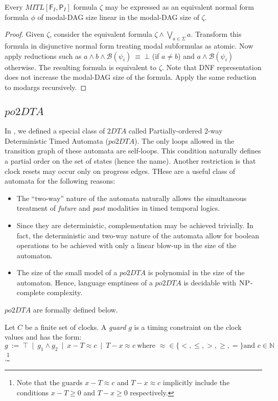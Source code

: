 \documentclass{llncs}
\newcommand{\class}{\textsc}
\newcommand{\fut}{\textsf{F}}
\newcommand{\past}{\textsf{P}}
\newcommand{\mitlfp}{\mbox{$\mathit{MITL[\fut_I,\past_I]}$}}
\newcommand{\potdta}{\mbox{$\mathit{po2DTA}$}}
\newcommand{\twodta}{\mbox{$\mathit{2DTA}$}}
\newcommand{\np}{\mbox{$\class{NP}$}}
\newcommand{\tab}{\hspace*{1cm}}
\begin{document}
\begin{proposition}\label{prop:norm}
Every \mitlfp\/ formula $\zeta$ may be expressed as an equivalent normal form formula $\phi$ of modal-DAG size linear in the  modal-DAG size of $\zeta$.
\end{proposition}
\begin{proof}
Given $\zeta$, consider the equivalent formula $\zeta \land \bigvee\limits_{a \in \Sigma} a$. Transform this formula in disjunctive normal form treating modal subformulas as atomic. Now apply reductions such as 
$a\land b\land \mathscr B(\psi_i) ~\equiv~ \bot$ (if $a\neq b$) and $a\land \mathscr B(\psi_i)$ otherwise. The resulting formula is equivalent to $\zeta$.
Note that  DNF representation does not increase the modal-DAG size of the formula. Apply the same reduction to modargs recursively.  
\end{proof}



\subsection{\potdta}
In \cite{PS10}, we defined a special class of \twodta\/ called Partially-ordered 2-way Deterministic Timed Automata (\potdta). The only loops allowed in the transition graph of these automata are self-loops. This condition naturally defines a partial order on the set of states (hence the name). Another restriction is that clock resets may occur only on progress edges. THese are a useful class of automata for the following reasons: 
\begin{itemize}
\item The ``two-way'' nature of the automata naturally allows the simultaneous treatment of \textit{future} and \textit{past} modalities in timed temporal logics.
\item Since they are deterministic, complementation may be achieved trivially. In fact, the deterministic and two-way nature of the automata allow for boolean operations to be achieved with only a linear blow-up in the size of the automaton.
\item The size of the small model of a \potdta\/ is polynomial in the size of the automaton. Hence, language emptiness of a \potdta\/ is decidable with \np-complete complexity.
\end{itemize} 

\potdta\/ are formally defined below.

Let $C$ be a finite set of clocks. A \emph{guard} $g$ is a timing constraint on the clock values and has the form:\\
\tab  $  g ~:=~ \top ~\mid~ g_1 \land g_2 ~\mid~ x-T\approx c ~\mid~ T-x\approx c ~\mbox{where $\approx\in \{<,\leq, >,\geq,=\}$
  and $c\in\mathbb{N}$}$.\footnote{Note that the guards $x-T\approx c$ and $T-x\approx c$ implicitly include the conditions $x-T\geq 0$ and $T-x\geq 0$ respectively.}\\
\end{document}
